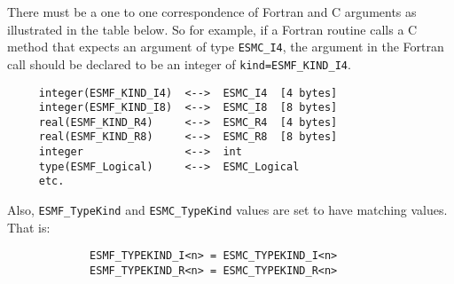 There must be a one to one correspondence of Fortran and C arguments as illustrated in the table below. So for example, if a Fortran routine calls a C method that expects an argument of type {\tt ESMC\_I4}, the argument in the Fortran call should be declared to be an integer of {\tt kind=ESMF\_KIND\_I4}.
\begin{verbatim}
     integer(ESMF_KIND_I4)  <-->  ESMC_I4  [4 bytes]
     integer(ESMF_KIND_I8)  <-->  ESMC_I8  [8 bytes]
     real(ESMF_KIND_R4)     <-->  ESMC_R4  [4 bytes]
     real(ESMF_KIND_R8)     <-->  ESMC_R8  [8 bytes]
     integer                <-->  int
     type(ESMF_Logical)     <-->  ESMC_Logical
     etc.
\end{verbatim}
Also, {\tt ESMF\_TypeKind} and {\tt ESMC\_TypeKind} values are set to have matching values. That is:
\begin{verbatim}
             ESMF_TYPEKIND_I<n> = ESMC_TYPEKIND_I<n>
             ESMF_TYPEKIND_R<n> = ESMC_TYPEKIND_R<n>
\end{verbatim}
















